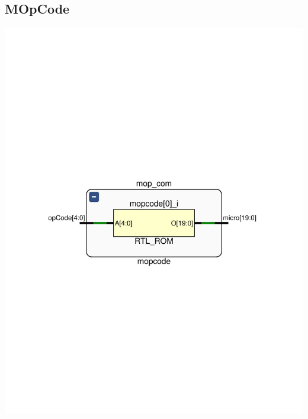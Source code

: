 \documentclass[8pt,executivepaper]{article}
\begin{document}
\subsection{MOpCode}
\begin{center}
  \includegraphics[scale=0.75]{rtl/mopcode.pdf}
\end{center}
\end{document}
